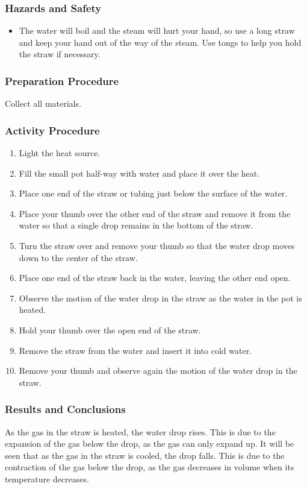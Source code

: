 \subsubsection*{Hazards and Safety}
\begin{itemize}
\item{The water will boil and the steam will hurt your hand, so use a long straw and keep your hand out of the way of the steam. Use tongs to help you hold the straw if necessary.} 
\end{itemize}

\subsubsection*{Preparation Procedure}
Collect all materials.

\subsubsection*{Activity Procedure}
\begin{enumerate}
\item{Light the heat source.} 
\item{Fill the small pot half-way with water and place it over the heat.} 
\item{Place one end of the straw or tubing just below the surface of the water.} 
\item{Place your thumb over the other end of the straw and remove it from the water so that a single drop remains in the bottom of the straw.} 
\item{Turn the straw over and remove your thumb so that the water drop moves down to the center of the straw.} 
\item{Place one end of the straw back in the water, leaving the other end open.} 
\item{Observe the motion of the water drop in the straw as the water in the pot is heated.} 
\item{Hold your thumb over the open end of the straw.} 
\item{Remove the straw from the water and insert it into cold water.} 
\item{Remove your thumb and observe again the motion of the water drop in the straw.} 
\end{enumerate}

\subsubsection*{Results and Conclusions}
As the gas in the straw is heated, the water drop rises. This is due to the expansion of the gas below the drop, as the gas can only expand up. It will be seen that as the gas in the straw is cooled, the drop falls. This is due to the contraction of the gas below the drop, as the gas decreases in volume when its temperature decreases.  

